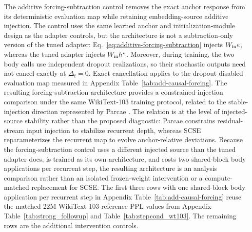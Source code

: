 \documentclass[letterpaper]{article} %
\newcommand{\SCSE}{\textsc{SCSE}}
\theoremstyle{remark}
\begin{document}
The additive forcing-subtraction control removes the exact anchor response from its deterministic evaluation map while retaining embedding-source additive injection.  The control uses the same learned anchor and initialization-module design as the adapter controls, but the architecture is not a subtraction-only version of the tuned adapter: Eq.~\ref{eq:additive-forcing-subtraction} injects $W_{\rm in}e$, whereas the tuned adapter injects $W_{\rm in}h^\star$.  Moreover, during training, the two body calls use independent dropout realizations, so their stochastic outputs need not cancel exactly at $\Delta_t=0$.  Exact cancellation applies to the dropout-disabled evaluation map measured in Appendix Table~\ref{tab:add-causal-forcing}.  The resulting forcing-subtraction architecture provides a constrained-injection comparison under the same WikiText-103 training protocol, related to the stable-injection direction represented by Parcae \citep{prairie2026parcae}.  The relation is at the level of injected-source stability rather than the proposed diagnostic: Parcae constrains residual-stream input injection to stabilize recurrent depth, whereas \SCSE{} reparameterizes the recurrent map to evolve anchor-relative deviations.  Because the forcing-subtraction control uses a different injected source than the tuned adapter does, is trained as its own architecture, and costs two shared-block body applications per recurrent step, the resulting architecture is an analysis comparison rather than an isolated frozen-weight intervention or a compute-matched replacement for \SCSE{}.  The first three rows with one shared-block body application per recurrent step in Appendix Table~\ref{tab:add-causal-forcing} reuse the matched 22M WikiText-103 reference PPL values from Appendix Table~\ref{tab:strong_followup} and Table~\ref{tab:stepcond_wt103}.  The remaining rows are the additional intervention controls.
\end{document}
